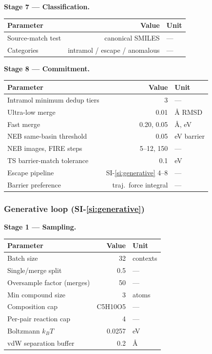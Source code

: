 \bigskip

\noindent\textbf{Stage 7 --- Classification.}\par\nopagebreak
\noindent\begin{tabular}{p{5cm}rl}
\toprule
Parameter & Value & Unit \\
\midrule
Source-match test & canonical SMILES & --- \\
Categories & intramol / escape / anomalous & --- \\
\bottomrule
\end{tabular}

\bigskip

\noindent\textbf{Stage 8 --- Commitment.}\par\nopagebreak
\noindent\begin{tabular}{p{5cm}rl}
\toprule
Parameter & Value & Unit \\
\midrule
Intramol minimum dedup tiers & 3 & --- \\
Ultra-low merge & 0.01 & \AA{} RMSD \\
Fast merge & 0.20, 0.05 & \AA{}, eV \\
NEB same-basin threshold & 0.05 & eV barrier \\
NEB images, FIRE steps & 5--12, 150 & --- \\
TS barrier-match tolerance & 0.1 & eV \\
Escape pipeline & SI-\ref{si:generative} 4--8 & --- \\
Barrier preference & traj.\ force integral & --- \\
\bottomrule
\end{tabular}

\bigskip

\subsubsection{Generative loop (SI-\ref{si:generative})}
\label{sec:params-gen}

\noindent\textbf{Stage 1 --- Sampling.}\par\nopagebreak
\noindent\begin{tabular}{p{5cm}rl}
\toprule
Parameter & Value & Unit \\
\midrule
Batch size & 32 & contexts \\
Single/merge split & 0.5 & --- \\
Oversample factor (merges) & 50 & --- \\
Min compound size & 3 & atoms \\
Composition cap & C5H10O5 & --- \\
Per-pair reaction cap & 4 & --- \\
Boltzmann $k_B T$ & 0.0257 & eV \\
vdW separation buffer & 0.2 & \AA \\
\bottomrule
\end{tabular}

